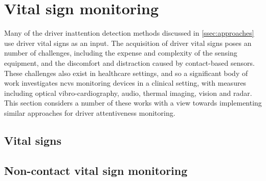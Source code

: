 \documentclass[11pt, parskip=half*,twoside=false]{scrbook}
\begin{document}
\section{Vital sign monitoring} \label{sec:vital_sign}
%

Many of the driver inattention detection methods discussed in \cref{ssec:approaches} use driver vital signs as an input. The acquisition of driver vital signs poses an number of challenges, including the expense and complexity of the sensing equipment, and the discomfort and distraction caused by contact-based sensors. These challenges also exist in healthcare settings, and so a significant body of work investigates \gls{ncvs} monitoring devices in a clinical setting, with measures including optical vibro-cardiography, audio, thermal imaging, vision and radar. This section considers a number of these works with a view towards implementing similar approaches for driver attentiveness monitoring.

\subsection{Vital signs} \label{ssec:vital_signs}
%
%

\subsection{Non-contact vital sign monitoring}
\end{document}
